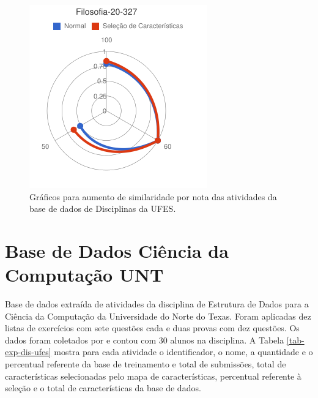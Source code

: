 \begin{figure}
\begin{minipage}{.3\textwidth}
\end{minipage} %
\begin{minipage}{.3\textwidth}
  \centering
  \includegraphics[width=\linewidth]{img/red-ufes-moodle/image21.png}
\end{minipage}
\caption{Gráficos para aumento de similaridade por nota das atividades da base de dados de Disciplinas da UFES.}
\end{figure}

\newpage
\section{Base de Dados Ciência da Computação UNT} \label{sec-DS-CC-UNT}
Base de dados extraída de atividades da disciplina de Estrutura de Dados para a Ciência da Computação da Universidade do Norte do Texas. Foram aplicadas dez listas de exercícios com sete questões cada e duas provas com dez questões. Os dados foram coletados por \cite{mohler2011} e contou com 30 alunos na disciplina. A Tabela \ref{tab-exp-dis-ufes} mostra para cada atividade o identificador, o nome, a quantidade e o percentual referente da base de treinamento e total de submissões, total de características selecionadas pelo mapa de características, percentual referente à seleção e o total de características da base de dados.

